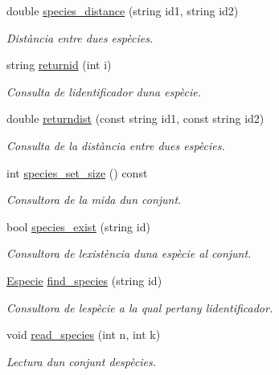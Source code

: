 \begin{DoxyCompactItemize}
double \hyperlink{class_cjt___especies_abf55093b325fd101ef73aa18dd1cf823}{species\+\_\+distance} (string id1, string id2)
\begin{DoxyCompactList}\small\item\em Distància entre dues espècies. \end{DoxyCompactList}\item 
string \hyperlink{class_cjt___especies_af33bf6763e518251a77642136064bdbf}{returnid} (int i)
\begin{DoxyCompactList}\small\item\em Consulta de l\textquotesingle{}identificador d\textquotesingle{}una espècie. \end{DoxyCompactList}\item 
double \hyperlink{class_cjt___especies_ae13d0a3a9f8b0ed9bba78b1c6c9d4eaa}{returndist} (const string id1, const string id2)
\begin{DoxyCompactList}\small\item\em Consulta de la distància entre dues espècies. \end{DoxyCompactList}\item 
int \hyperlink{class_cjt___especies_a011e96e195dfe5997d42e7937fe2099c}{species\+\_\+set\+\_\+size} () const
\begin{DoxyCompactList}\small\item\em Consultora de la mida d\textquotesingle{}un conjunt. \end{DoxyCompactList}\item 
bool \hyperlink{class_cjt___especies_a2ce9d7a4968d46686109477f448857ea}{species\+\_\+exist} (string id)
\begin{DoxyCompactList}\small\item\em Consultora de l\textquotesingle{}existència d\textquotesingle{}una espècie al conjunt. \end{DoxyCompactList}\item 
\hyperlink{class_especie}{Especie} \hyperlink{class_cjt___especies_a1e01bf8dfbde0983404efba05bd1b4b3}{find\+\_\+species} (string id)
\begin{DoxyCompactList}\small\item\em Consultora de l\textquotesingle{}espècie a la qual pertany l\textquotesingle{}identificador. \end{DoxyCompactList}\item 
void \hyperlink{class_cjt___especies_a273156c50e67be8815bdd1c31cc1661a}{read\+\_\+species} (int n, int k)
\begin{DoxyCompactList}\small\item\em Lectura d\textquotesingle{}un conjunt d\textquotesingle{}espècies. \end{DoxyCompactList}\item 

\end{DoxyCompactItemize}

